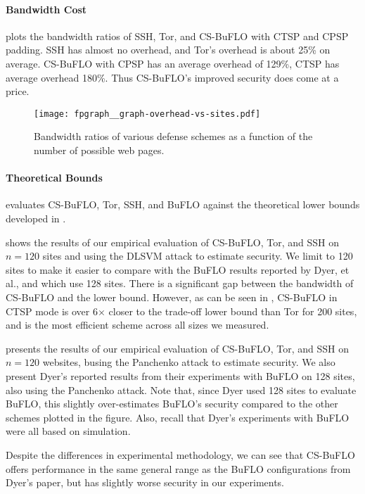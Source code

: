 \documentclass[10pt,journal]{IEEEtran}
\newcommand{\buflo} {BuFLO\xspace}
\newcommand{\csb} {CS-BuFLO\xspace}
\begin{document}
\paragraph*{Bandwidth Cost}  plots the bandwidth ratios
of SSH, Tor, and \csb with CTSP and CPSP padding.  SSH has almost no
overhead, and Tor's overhead is about 25\% on average.  \csb with CPSP
has an average overhead of 129\%, CTSP has average overhead 180\%.  Thus
\csb's improved security does come at a price.

\begin{figure}[t]
  \centering
  \texttt{[image: fpgraph\_\_graph-overhead-vs-sites.pdf]}
  \caption{\label{fig:overhead} Bandwidth ratios of various defense schemes as a function of the number of possible web pages.}
\end{figure}

\paragraph*{Theoretical Bounds}
 evaluates \csb, Tor, SSH, and
\buflo against the theoretical lower bounds developed in
.

 shows the results of our empirical evaluation
of \csb, Tor, and SSH on $n=120$ sites and using the DLSVM attack to
estimate security.  We limit to 120 sites to make it easier to compare
with the \buflo results reported by Dyer, et al., and which use 128
sites.  There is a significant gap between the bandwidth of \csb and
the lower bound.  However, as can be seen in
, \csb in CTSP mode is over 6$\times$ closer
to the trade-off lower bound than Tor for 200 sites, and is the most
efficient scheme across all sizes we measured.

 presents the results of our empirical
evaluation of \csb, Tor, and SSH on $n=120$ websites, busing the
Panchenko attack to estimate security.  We also present Dyer's
reported results from their experiments with \buflo on 128 sites, also
using the Panchenko attack.  Note that, since Dyer used 128 sites to
evaluate \buflo, this slightly over-estimates \buflo's security
compared to the other schemes plotted in the figure.  Also, recall
that Dyer's experiments with \buflo were all based on simulation.  

Despite the differences in experimental methodology, we can see that
\csb offers performance in the same general range as the \buflo
configurations from Dyer's paper, but has slightly worse security in
our experiments.  
\end{document}
